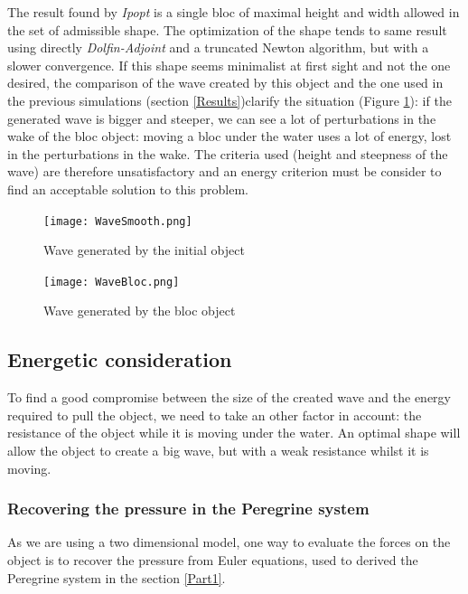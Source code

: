 \documentclass[11pt,a4paper]{article}
\begin{document}
	The result found by \textit{Ipopt} is a single bloc of maximal height and width allowed in the set of admissible shape. The optimization of the shape tends to same result using directly \textit{Dolfin-Adjoint} and a truncated Newton algorithm, but with a slower convergence. If this shape seems minimalist at first sight and not the one desired, the comparison of the wave created by this object and the one used in the previous simulations (section \ref{Results})clarify the situation (Figure \ref{WaveBloc}): if the generated wave is bigger and steeper, we can see a lot of perturbations in the wake of the bloc object: moving a bloc under the water uses a lot of energy, lost in the perturbations in the wake. The criteria used (height and steepness of the wave) are therefore unsatisfactory and an energy criterion must be consider to find an acceptable solution to this problem.	
	\begin{figure}[!h]
		\begin{minipage}[t]{0.5\linewidth}
			\centering
			\texttt{[image: WaveSmooth.png]}
			\caption{Wave generated by the initial object}
		\end{minipage}
		\hspace{10pt}
		\begin{minipage}[t]{0.5\linewidth}
			\centering
			\texttt{[image: WaveBloc.png]}
			\caption{Wave generated by the bloc object}
			\label{WaveBloc}
		\end{minipage}
	\end{figure}

\subsection{Energetic consideration}

	To find a good compromise between the size of the created wave and the energy required to pull the object, we need to take an other factor in account: the resistance of the object while it is moving under the water. An optimal shape will allow the object to create a big wave, but with a weak resistance whilst it is moving.
	
\subsubsection{Recovering the pressure in the Peregrine system}		
	As we are using a two dimensional model, one way to evaluate the forces on the object is to recover the pressure from Euler equations, used to derived the Peregrine system in the section \ref{Part1}.
				
\end{document}
